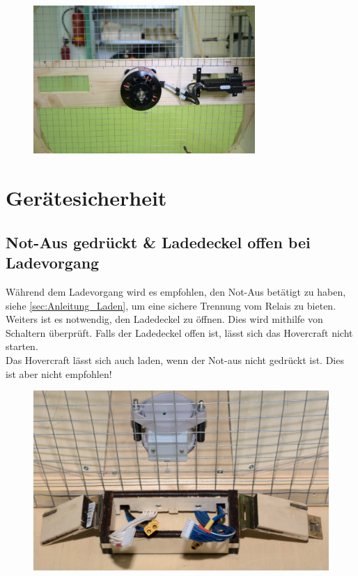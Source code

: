 \begin{figure}[H]
    \centering
    \includegraphics[width=0.75\textwidth]{Fotos/Konstruktion/DSC_8776_gitter_hinten.png}
\end{figure}


\section{Gerätesicherheit \label{sec:Geraetesicherheit}}

\subsection{Not-Aus gedrückt \& Ladedeckel offen bei Ladevorgang}
Während dem Ladevorgang wird es empfohlen, den Not-Aus betätigt zu haben, siehe \ref{sec:Anleitung_Laden}, um eine sichere Trennung vom Relais zu bieten. \\
Weiters ist es notwendig, den Ladedeckel zu öffnen. Dies wird mithilfe von Schaltern überprüft. Falls der Ladedeckel offen ist, lässt sich das Hovercraft nicht starten. \\
Das Hovercraft lässt sich auch laden, wenn der Not-aus nicht gedrückt ist. Dies ist aber nicht empfohlen!

\begin{figure}[H]
    \centering
    \includegraphics[width=\textwidth]{Fotos/Ladedeckel_DSC_8794.png}
\end{figure}

